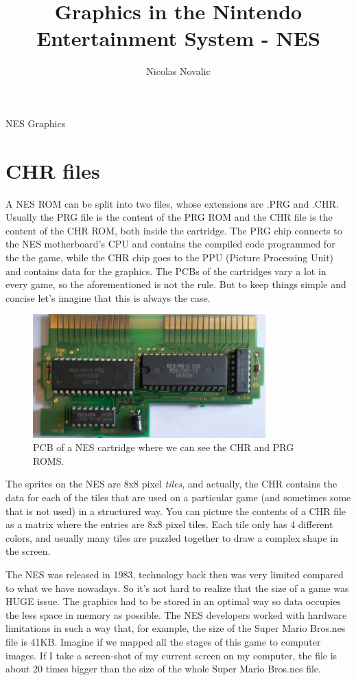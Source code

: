 \documentclass{article}
\title{ \textbf{ Graphics in the Nintendo Entertainment System - NES } }
\author{ Nicolas Novalic }
\begin{document}
\begin{center}
	{\Huge NES Graphics}
\end{center}

\section*{CHR files}

A NES ROM can be split into two files, whose extensions are .PRG and .CHR. Usually the PRG file is the content of the PRG ROM and the CHR file is the content of the CHR ROM, both inside the cartridge. The PRG chip connects to the NES motherboard's CPU and contains the compiled code programmed for the the game, while the CHR chip goes to the PPU (Picture Processing Unit) and contains data for the graphics. The PCBs of the cartridges vary a lot in every game, so the aforementioned is not the rule. But to keep things simple and concise let's imagine that this is always the case.

\begin{figure}[h]
\centering
\includegraphics[width=0.8\textwidth]{pcb}
\caption{PCB of a NES cartridge where we can see the CHR and PRG ROMS.}
\end{figure}


The sprites on the NES are 8x8 pixel \textit{tiles}, and actually, the CHR contains the data for each of the tiles that are used on a particular game (and sometimes some that is not used) in a structured way. You can picture the contents of a CHR file as a matrix where the entries are 8x8 pixel tiles. Each tile only has 4 different colors, and usually many tiles are puzzled together to draw a complex shape in the screen.
\vskip 0.2in

The NES was released in 1983, technology back then was very limited compared to what we have nowadays. So it's not hard to realize that the size of a game was HUGE issue. The graphics had to be stored in an optimal way so data occupies the less space in memory as possible. The NES developers worked with hardware limitations in such a way that, for example, the size of the Super Mario Bros.nes file is 41KB. Imagine if we mapped all the stages of this game to computer images. If I take a screen-shot of my current screen on my computer, the file is about 20 times bigger than the size of the whole Super Mario Bros.nes file. 
\end{document}
